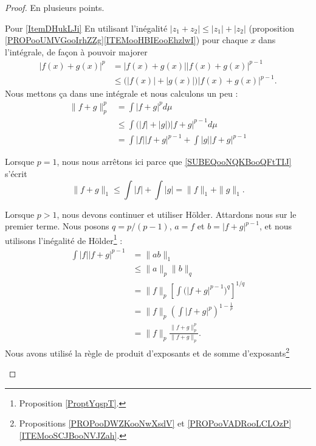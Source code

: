 \begin{proof}
	En plusieurs points.
	\begin{subproof}
		\item[Pour \ref{ItemDHukLJi}]
            En utilisant l'inégalité \( | z_1+z_2 |\leq | z_1 |+| z_2 |\) (proposition \ref{PROPooUMVGooIrhZZg}\ref{ITEMooHBIEooEhzlwI}) pour chaque \( x\) dans l'intégrale, de façon à pouvoir majorer
		\begin{subequations}
			\begin{align}
				| f(x)+g(x) |^p & =| f(x)+g(x) | |f(x)+g(x) |^{p-1}                     \\
				                & \leq\big( | f(x) |+| g(x) | \big)| f(x)+g(x) |^{p-1}.
			\end{align}
		\end{subequations}
		Nous mettons ça dans une intégrale et nous calculons un peu :
		\begin{subequations}        \label{SUBEQSooGWMTooDBXSgL}
			\begin{align}
				\| f+g \|^p_p & =\int| f+g |^pd\mu                                                         \\
				              & \leq \int\big( | f |+| g | \big)| f+g |^{p-1}d\mu                          \\
				              & =\int| f | |f+g |^{p-1}+\int| g | |f+g |^{p-1} \label{SUBEQooNQKBooQFtTIJ}
			\end{align}
		\end{subequations}

		Lorsque \( p=1\), nous nous arrêtons ici parce que \eqref{SUBEQooNQKBooQFtTIJ} s'écrit
		\begin{equation}
			\| f+g \|_1\leq\int| f |+\int| g |=\| f \|_1+\| g \|_1.
		\end{equation}

		Lorsque \( p>1\), nous devons continuer et utiliser Hölder. Attardons nous sur le premier terme. Nous posons \( q=p/(p-1)\), \( a=f\) et \( b=| f+g |^{p-1}\), et nous utilisons l'inégalité de Hölder\footnote{Proposition \ref{ProptYqspT}.} :
		\begin{subequations}        \label{SUBEQSooFINUooQfIdMS}
			\begin{align}
				\int| f | |f+g |^{p-1} & =\| ab \|_1                                                      \\
				                       & \leq \| a \|_p\| b \|_q                                          \\
				                       & =\| f \|_p \left[ \int \big( | f+g |^{p-1} \big)^q \right]^{1/q} \\
				                       & =\| f \|_p\left( \int| f+g |^p \right)^{1-\frac{1}{ p }}         \\
				                       & =\| f \|_p\frac{ \| f+g \|_p^p }{ \| f+g \|_p }.
			\end{align}
		\end{subequations}
		Nous avons utilisé la règle de produit d'exposants et de somme d'exposants\footnote{Propositions \ref{PROPooDWZKooNwXsdV} et \ref{PROPooVADRooLCLOzP}\ref{ITEMooSCJBooNVJZah}.}


\end{subproof}
\end{proof}
